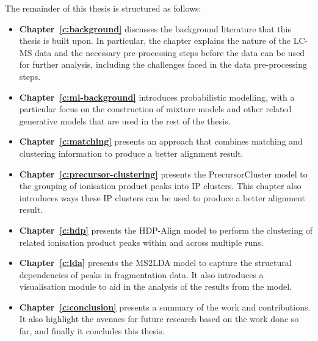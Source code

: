 The remainder of this thesis is structured as follows:

\begin{itemize}
\item \textbf{Chapter~\ref{c:background}} discusses the background literature that this thesis is built upon. In particular, the chapter explains the nature of the LC-MS data and the necessary pre-processing steps before the data can be used for further analysis, including the challenges faced in the data pre-processing steps.
\item \textbf{Chapter~\ref{c:ml-background}} introduces probabilistic modelling, with a particular focus on the construction of mixture models and other related generative models that are used in the rest of the thesis.
\item \textbf{Chapter~\ref{c:matching}} presents an approach that combines matching and clustering information to produce a better alignment result.
\item \textbf{Chapter~\ref{c:precursor-clustering}} presents the PrecursorCluster model to the grouping of ionisation product peaks into IP clusters. This chapter also introduces ways these IP clusters can be used to produce a better alignment result.
\item \textbf{Chapter~\ref{c:hdp}} presents the HDP-Align model to perform the clustering of related ionisation product peaks within and across multiple runs. 
\item \textbf{Chapter~\ref{c:lda}} presents the MS2LDA model to capture the structural dependencies of peaks in fragmentation data. It also introduces a visualisation module to aid in the analysis of the results from the model. 
\item \textbf{Chapter~\ref{c:conclusion}} presents a summary of the work and contributions. It also highlight the avenues for future research based on the work done so far, and finally it concludes this thesis. 
\end{itemize}